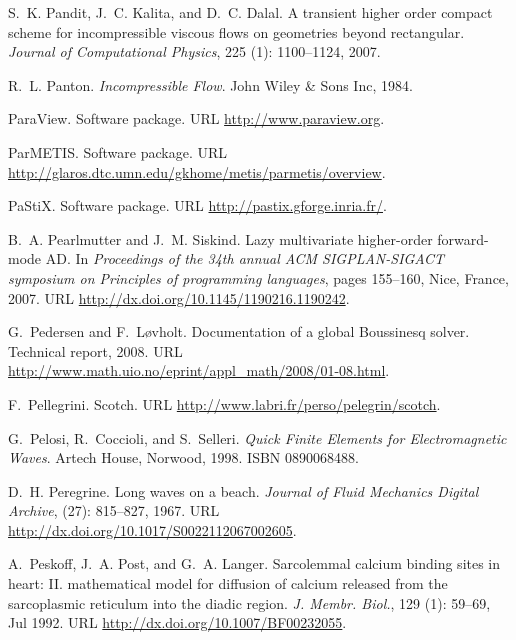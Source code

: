 \begin{thebibliography}{467}
S.~K. Pandit, J.~C. Kalita, and D.~C. Dalal.
\newblock A transient higher order compact scheme for incompressible viscous
  flows on geometries beyond rectangular.
\newblock \emph{Journal of Computational Physics}, 225 (1):
  1100--1124, 2007.

R.~L. Panton.
\newblock \emph{Incompressible Flow}.
\newblock John Wiley \& Sons Inc, 1984.

{ParaView}.
\newblock Software package.
\newblock URL \url{http://www.paraview.org}.

ParMETIS.
\newblock Software package.
\newblock URL \url{http://glaros.dtc.umn.edu/gkhome/metis/parmetis/overview}.

PaStiX.
\newblock Software package.
\newblock URL \url{http://pastix.gforge.inria.fr/}.

B.~A. Pearlmutter and J.~M. Siskind.
\newblock Lazy multivariate higher-order forward-mode {AD}.
\newblock In \emph{Proceedings of the 34th annual ACM SIGPLAN-SIGACT symposium
  on Principles of programming languages}, pages 155--160, Nice, France, 2007.
\newblock URL \url{http://dx.doi.org/10.1145/1190216.1190242}.

G.~Pedersen and F.~L{\o}vholt.
\newblock Documentation of a global {B}oussinesq solver.
\newblock Technical report, 2008.
\newblock URL \url{http://www.math.uio.no/eprint/appl_math/2008/01-08.html}.

F.~Pellegrini.
\newblock Scotch.
\newblock URL \url{http://www.labri.fr/perso/pelegrin/scotch}.

G.~Pelosi, R.~Coccioli, and S.~Selleri.
\newblock \emph{Quick Finite Elements for Electromagnetic Waves}.
\newblock Artech House, Norwood, 1998.
\newblock ISBN 0890068488.

D.~H. Peregrine.
\newblock Long waves on a beach.
\newblock \emph{Journal of Fluid Mechanics Digital Archive}, 
  (27): 815--827, 1967.
\newblock URL \url{http://dx.doi.org/10.1017/S0022112067002605}.

A.~Peskoff, J.~A. Post, and G.~A. Langer.
\newblock Sarcolemmal calcium binding sites in heart: {II}. mathematical model
  for diffusion of calcium released from the sarcoplasmic reticulum into the
  diadic region.
\newblock \emph{J. Membr. Biol.}, 129 (1): 59--69, Jul 1992.
\newblock URL \url{http://dx.doi.org/10.1007/BF00232055}.


\end{thebibliography}
